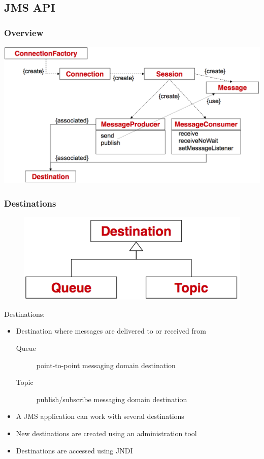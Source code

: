 \documentclass[10pt]{article}
\begin{document}
\subsection{JMS API}
\subsubsection{Overview}
\begin{center}
	\includegraphics[scale=0.25]{images/jms-api-overview.png}
\end{center}
\subsubsection{Destinations}
\begin{figure}
	\centering
	\includegraphics[scale=0.2]{images/jms-api-destination.png}%
\end{figure}
Destinations:
\begin{itemize}
	\item Destination where messages are delivered to or received from
		\begin{description}
			\item[Queue] point-to-point messaging domain destination
			\item[Topic] publish/subscribe messaging domain destination
		\end{description}
	\item A JMS application can work with several destinations
	\item New destinations are created using an administration tool
	\item Destinations are accessed using JNDI
\end{itemize}
\end{document}
